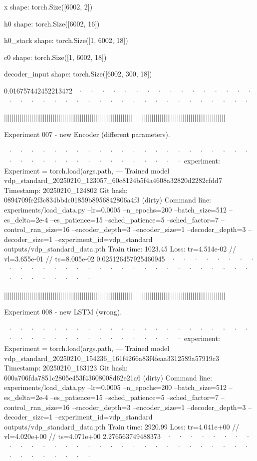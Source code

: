 x shape: torch.Size([6002, 2])

h0 shape: torch.Size([6002, 16])

h0_stack shape: torch.Size([1, 6002, 18])

c0 shape: torch.Size([1, 6002, 18])

decoder_input shape: torch.Size([6002, 300, 18])



0.016757442452213472
~· ~· ~· ~· ~· ~· ~· ~· ~· ~· ~· ~· ~· ~· ~· ~· ~· ~· ~· ~· ~· ~· ~· ~· ~· ~· ~· ~· ~· ~· ~· ~· ~· ~· ~· ~· ~· ~·



||||||||||||||||||||||||||||||||||||||||||||||||||||||||||||||||||||||||||||||||||||||||||||||||||||||||||||||||||


Experiment 007 - new Encoder (different parameters). 


~· ~· ~· ~· ~· ~· ~· ~· ~· ~· ~· ~· ~· ~· ~· ~· ~· ~· ~· ~· ~· ~· ~· ~· ~· ~· ~· ~· ~· ~· ~· ~· ~· ~· ~· ~· ~· ~· 
  experiment: Experiment = torch.load(args.path,
--- Trained model   vdp_standard_20250210_123057_60c8124b5f4a4608a32820d2282cfdd7
Timestamp:      20250210_124802
Git hash:       0894709fe2f3c834bb4c01859b8956842806a4f3 (dirty)
Command line:   experiments/load_data.py --lr=0.0005 --n_epochs=200 --batch_size=512 --es_delta=2e-4 --es_patience=15 --sched_patience=5 --sched_factor=7 --control_rnn_size=16 --encoder_depth=3 --encoder_size=1 --decoder_depth=3 --decoder_size=1 --experiment_id=vdp_standard outputs/vdp_standard_data.pth
Train time:     1023.45
Loss:           tr=4.514e-02 // vl=3.655e-01 // ts=8.005e-02
0.025126457925460945
~· ~· ~· ~· ~· ~· ~· ~· ~· ~· ~· ~· ~· ~· ~· ~· ~· ~· ~· ~· ~· ~· ~· ~· ~· ~· ~· ~· ~· ~· ~· ~· ~· ~· ~· ~· ~· ~· 



||||||||||||||||||||||||||||||||||||||||||||||||||||||||||||||||||||||||||||||||||||||||||||||||||||||||||||||||||


Experiment 008 - new LSTM (wrong). 


~· ~· ~· ~· ~· ~· ~· ~· ~· ~· ~· ~· ~· ~· ~· ~· ~· ~· ~· ~· ~· ~· ~· ~· ~· ~· ~· ~· ~· ~· ~· ~· ~· ~· ~· ~· ~· ~· 
  experiment: Experiment = torch.load(args.path,
--- Trained model   vdp_standard_20250210_154236_161f4266a83f4feaa3312589a57919c3
Timestamp:      20250210_163123
Git hash:       600a706fda7851c2805e453f43608008d62e21a6 (dirty)
Command line:   experiments/load_data.py --lr=0.0005 --n_epochs=200 --batch_size=512 --es_delta=2e-4 --es_patience=15 --sched_patience=5 --sched_factor=7 --control_rnn_size=16 --encoder_depth=3 --encoder_size=1 --decoder_depth=3 --decoder_size=1 --experiment_id=vdp_standard outputs/vdp_standard_data.pth
Train time:     2920.99
Loss:           tr=4.041e+00 // vl=4.020e+00 // ts=4.071e+00
2.276563749488373
~· ~· ~· ~· ~· ~· ~· ~· ~· ~· ~· ~· ~· ~· ~· ~· ~· ~· ~· ~· ~· ~· ~· ~· ~· ~· ~· ~· ~· ~· ~· ~· ~· ~· ~· ~· ~· ~· 



